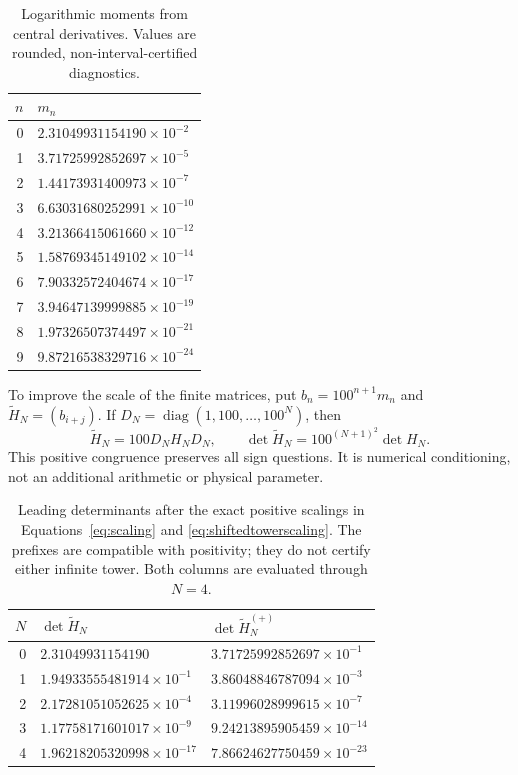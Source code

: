 \documentclass[11pt,letterpaper]{article}
\numberwithin{equation}{section}
\theoremstyle{definition}
\theoremstyle{remark}
\begin{document}
\begin{table}[htbp]
\centering
\caption{Logarithmic moments from central derivatives. Values are rounded, non-interval-certified diagnostics.}
\label{tab:moments}
\begin{tabular}{rl}
\toprule
$n$ & $m_n$\\
\midrule
0 & $2.31049931154190\times10^{-2}$\\
1 & $3.71725992852697\times10^{-5}$\\
2 & $1.44173931400973\times10^{-7}$\\
3 & $6.63031680252991\times10^{-10}$\\
4 & $3.21366415061660\times10^{-12}$\\
5 & $1.58769345149102\times10^{-14}$\\
6 & $7.90332572404674\times10^{-17}$\\
7 & $3.94647139999885\times10^{-19}$\\
8 & $1.97326507374497\times10^{-21}$\\
9 & $9.87216538329716\times10^{-24}$\\
\bottomrule
\end{tabular}
\end{table}

To improve the scale of the finite matrices, put $b_n=100^{n+1}m_n$ and $\widetilde H_N=(b_{i+j})$. If $D_N=\operatorname{diag}(1,100,\ldots,100^N)$, then
\begin{equation}
 \widetilde H_N=100D_NH_ND_N,\qquad
 \det\widetilde H_N=100^{(N+1)^2}\det H_N.
 \label{eq:scaling}
\end{equation}
This positive congruence preserves all sign questions. It is numerical conditioning, not an additional arithmetic or physical parameter.

\begin{table}[htbp]
\centering
\caption{Leading determinants after the exact positive scalings in Equations~\eqref{eq:scaling} and \eqref{eq:shiftedtowerscaling}. The prefixes are compatible with positivity; they do not certify either infinite tower. Both columns are evaluated through $N=4$.}
\label{tab:determinants}
\begin{tabular}{rll}
\toprule
$N$ & $\det\widetilde H_N$ & $\det\widetilde H_N^{(+)}$\\
\midrule
0 & $2.31049931154190$ & $3.71725992852697\times10^{-1}$\\
1 & $1.94933555481914\times10^{-1}$ & $3.86048846787094\times10^{-3}$\\
2 & $2.17281051052625\times10^{-4}$ & $3.11996028999615\times10^{-7}$\\
3 & $1.17758171601017\times10^{-9}$ & $9.24213895905459\times10^{-14}$\\
4 & $1.96218205320998\times10^{-17}$ & $7.86624627750459\times10^{-23}$\\
\bottomrule
\end{tabular}
\end{table}
\end{document}
